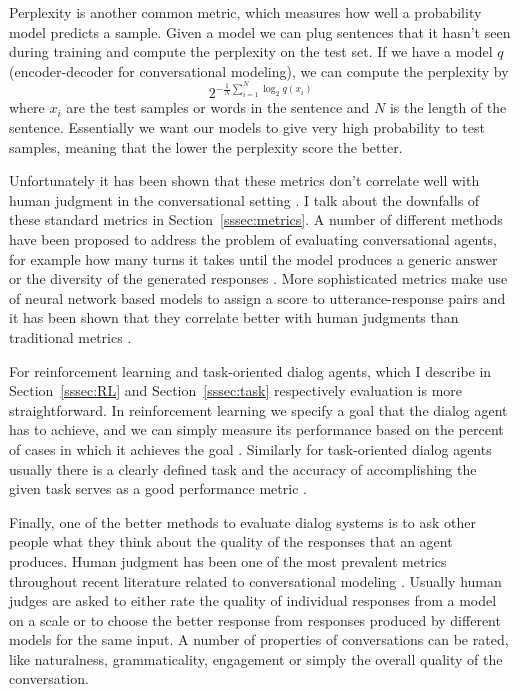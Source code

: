 \documentclass[12pt]{article}
\begin{document}
Perplexity \cite{Manning:1999} is another common metric, which measures how well a probability model predicts a sample. Given a model we can plug sentences that it hasn't seen during training and compute the perplexity on the test set. If we have a model \(q\) (encoder-decoder for conversational modeling), we can compute the perplexity by
\begin{equation}
2^{-\frac{1}{N}\sum_{i=1}^{N}\log_2{q(x_i)}}
\end{equation}
where \(x_i\) are the test samples or words in the sentence and \(N\) is the length of the sentence. Essentially we want our models to give very high probability to test samples, meaning that the lower the perplexity score the better.

Unfortunately it has been shown that these metrics don't correlate well with human judgment in the conversational setting \cite{Liu:2016}. I talk about the downfalls of these standard metrics in Section~\ref{sssec:metrics}. A number of different methods have been proposed to address the problem of evaluating conversational agents, for example how many turns it takes until the model produces a generic answer \cite{Zhao:2017,Li_RL:2016} or the diversity of the generated responses \cite{Li_RL:2016}. More sophisticated metrics make use of neural network based models to assign a score to utterance-response pairs and it has been shown that they correlate better with human judgments than traditional metrics \cite{Lowe:2017,Tao:2017}.

For reinforcement learning and task-oriented dialog agents, which I describe in Section~\ref{sssec:RL} and Section~\ref{sssec:task} respectively evaluation is more straightforward. In reinforcement learning we specify a goal that the dialog agent has to achieve, and we can simply measure its performance based on the percent of cases in which it achieves the goal \cite{Li_adversarial:2017,Havrylov:2017}. Similarly for task-oriented dialog agents usually there is a clearly defined task and the accuracy of accomplishing the given task serves as a good performance metric \cite{Joshi:2017,Zhao:2017,Li_HIL:2016}.

Finally, one of the better methods to evaluate dialog systems is to ask other people what they think about the quality of the responses that an agent produces. Human judgment has been one of the most prevalent metrics throughout recent literature related to conversational modeling \cite{Shang:2015,Vinyals:2015,Zhou:2017,Li_RL:2016,Zhao:2017,Li_RL:2016,Li:2015}. Usually human judges are asked to either rate the quality of individual responses from a model on a scale or to choose the better response from responses produced by different models for the same input. A number of properties of conversations can be rated, like naturalness, grammaticality, engagement or simply the overall quality of the conversation.
\end{document}
